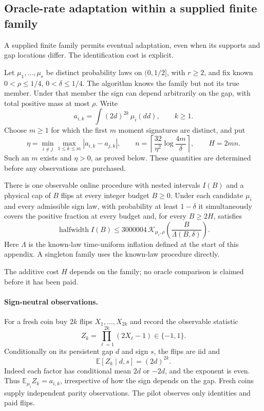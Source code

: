 \subsection{Oracle-rate adaptation within a supplied finite family}
\label{sec:finite-family-adaptation}

A supplied finite family permits eventual adaptation, even when its
supports and gap locations differ. The identification cost is explicit.

Let $\mu_1,\ldots,\mu_r$ be distinct probability laws on $(0,1/2]$, with
$r\ge2$, and fix known $0<\rho\le1/4$, $0<\delta\le1/4$. The algorithm knows
the family but not its true member. Under that member the sign can depend
arbitrarily on the gap, with total positive mass at most $\rho$.
Write
\[
 a_{i,k}=\int(2d)^{2k}\,\mu_i(dd),\qquad k\ge1.
\]
Choose $m\ge1$ for which the first $m$ moment signatures are distinct, and put
\[
 \eta=\min_{i\ne j}\max_{1\le k\le m}|a_{i,k}-a_{j,k}|,\qquad
 n=\left\lceil\frac{32}{\eta^2}\log\frac{4m}{\delta}\right\rceil,\qquad
 H=2mn.
 \tag{FA1}
\]
Such an $m$ exists and $\eta>0$, as proved below. These quantities are
determined before any observations are purchased.

\begin{theorem}\label{thm:finite-family-adaptation}
There is one observable online procedure with nested intervals $I(B)$ and
a physical cap of $B$ flips at every integer budget $B\ge0$. Under each
candidate $\mu_i$ and every admissible sign law, with probability at least
$1-\delta$ it simultaneously covers the positive fraction at every budget
and, for every $B\ge2H$, satisfies
\[
 \operatorname{halfwidth} I(B)\le
 3000004\,\mathcal K_{\mu_i,\rho}
       \!\left(\frac{B}{\Lambda(B,\delta)}\right).
 \tag{FA2}
\]
Here $\Lambda$ is the known-law time-uniform inflation defined at the start
of this appendix. A singleton family uses the known-law procedure directly.
\end{theorem}

The additive cost $H$ depends on the family; no oracle comparison is
claimed before it has been paid.

\paragraph{Sign-neutral observations.}
For a fresh coin buy $2k$ flips $X_1,\ldots,X_{2k}$ and record the observable
statistic
\[
 Z_k=\prod_{\ell=1}^{2k}(2X_\ell-1)\in\{-1,1\}.
\]
Conditionally on its persistent gap $d$ and sign $s$, the flips are iid and
\[
 \mathbb E[Z_k\mid d,s]=(2d)^{2k}.
 \tag{FA3}
\]
Indeed each factor has conditional mean $2d$ or $-2d$, and the exponent is
even. Thus $\mathbb E_{\mu_i}Z_k=a_{i,k}$, irrespective of how the sign
depends on the gap. Fresh coins supply independent parity observations.
The pilot observes only identities and paid flips.

